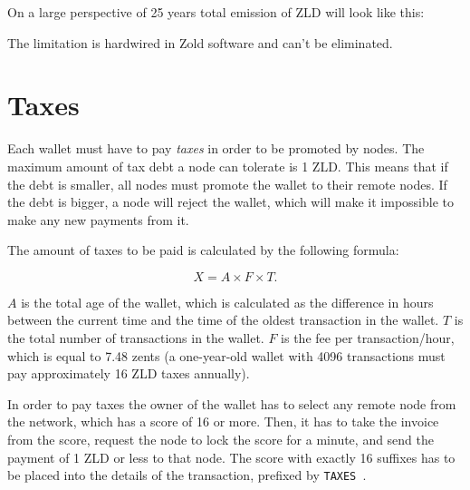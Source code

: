 \documentclass[11pt,oneside]{article}
\newcommand\dd[1]{\colorbox{gray!30}{\texttt{#1}}}
\begin{document}
On a large perspective of 25 years total emission of ZLD will look
like this:

\vspace{\parskip}\begin{center}\end{center}

The limitation is hardwired in Zold software and can't be eliminated.

\section{Taxes}

Each wallet must have to pay \emph{taxes} in order to be promoted by nodes.
The maximum amount of tax debt a node can tolerate is 1 ZLD. This means
that if the debt is smaller, all nodes must promote the wallet to their
remote nodes. If the debt is bigger, a node will reject the wallet,
which will make it impossible to make any new payments from it.

The amount of taxes to be paid is calculated by the following formula:

$$X = A \times F \times T.$$

$A$ is the total age of the wallet,
which is calculated as the difference in hours between the current time
and the time of the oldest transaction in the wallet.
$T$ is the total number of transactions in the wallet.
$F$ is the fee per transaction/hour, which is equal to 7.48 zents
(a one-year-old wallet with 4096 transactions must pay approximately 16 ZLD taxes annually).

In order to pay taxes the owner of the wallet has to select any remote
node from the network, which has a score of 16 or more. Then, it has to
take the invoice from the score, request the node to lock the score
for a minute, and send the payment of 1 ZLD or less
to that node. The score with exactly 16 suffixes
has to be placed into the details of the transaction,
prefixed by \dd{TAXES }.
\end{document}
